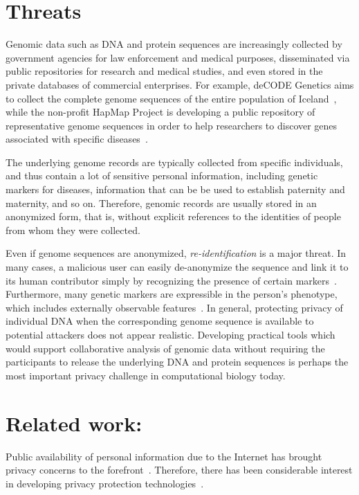 \section{Threats}
Genomic data such as DNA and protein sequences are increasingly collected
by government agencies for law enforcement and medical purposes,
disseminated via public repositories for research and medical studies,
and even stored in the private databases of commercial enterprises.
For example, deCODE Genetics aims to collect the complete genome sequences
of the entire population of Iceland~\cite{decode}, while the non-profit
HapMap Project is developing a public repository of representative genome
sequences in order to help researchers to discover genes associated with
specific diseases~\cite{hapmap}.

The underlying genome records are typically collected from specific
individuals, and thus contain a lot of sensitive personal information,
including genetic markers for diseases, information that can be be used to
establish paternity and maternity, and so on.  Therefore, genomic records
are usually stored in an anonymized form, that is, without explicit
references to the identities of people from whom they were collected.

Even if genome sequences are anonymized, \emph{re-identification} is a
major threat.  In many cases, a malicious user can easily de-anonymize
the sequence and link it to its human contributor simply by recognizing
the presence of certain markers~\cite{cmugenome}.  Furthermore,
many genetic markers are expressible in the person's phenotype, which
includes externally observable features~\cite{harvard}.  In general,
protecting privacy of individual DNA when the corresponding genome
sequence is available to potential attackers does not appear realistic.
Developing practical tools which would support collaborative analysis of
genomic data without requiring the participants to release the underlying
DNA and protein sequences is perhaps the most important privacy challenge
in computational biology today.

\section{Related work:} 
Public availability of personal information due to the Internet has
brought privacy concerns to the forefront~\cite{cra99,tur03}.  Therefore,
there has been considerable interest in developing privacy protection
technologies~\cite{p3p02,gwb97,rks+97}.

